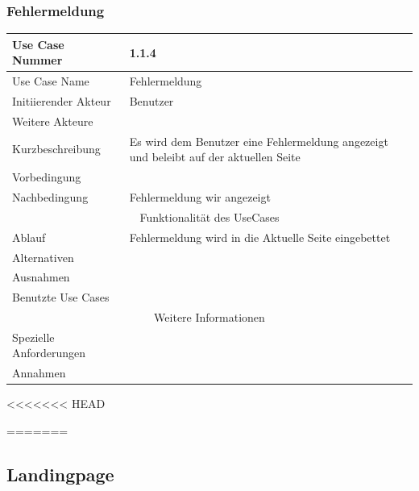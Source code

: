 \documentclass[10pt,a4paper]{article}
\begin{document}
	\subsubsection{Fehlermeldung}
		\begin{tabular}{|l|p{.5\linewidth}|}
		\hline Use Case Nummer & 1.1.4 \\ 
		\hline Use Case Name & Fehlermeldung \\ 
		\hline Initiierender Akteur & Benutzer \\
		\hline Weitere Akteure &  \\
		\hline Kurzbeschreibung & Es wird dem Benutzer eine Fehlermeldung angezeigt und beleibt auf der aktuellen Seite \\
		\hline Vorbedingung &  \\
		\hline Nachbedingung & Fehlermeldung wir angezeigt \\
		\hline \multicolumn{2}{|c|}{Funktionalität des UseCases}\\
		\hline Ablauf & Fehlermeldung wird in die Aktuelle Seite eingebettet \\
		\hline Alternativen &  \\
		\hline Ausnahmen &  \\
		\hline Benutzte Use Cases &  \\
		\hline \multicolumn{2}{|c|}{Weitere Informationen} \\
		\hline Spezielle Anforderungen &  \\
		\hline Annahmen &  \\
		\hline
		\end{tabular} 
<<<<<<< HEAD
	 

=======
\subsection{Landingpage}
\end{document}
